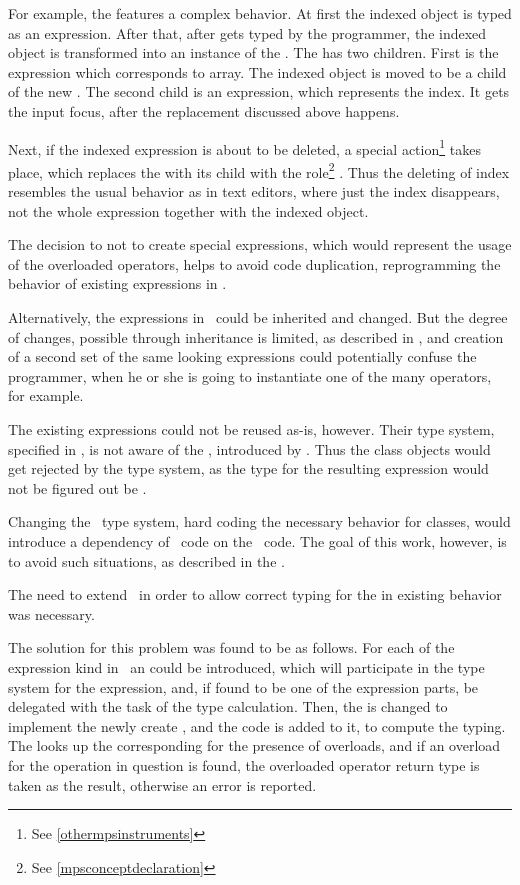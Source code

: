For example,  the  features a complex behavior. At first the indexed 
object is typed as an expression. After that, after \cc{[} gets typed by the programmer,
the indexed object is transformed into an instance of the 
. The  has two children. First is the expression
which corresponds to array. The indexed object is moved to be a child of the new .
The second child is an expression, which represents the index. It gets the input focus,
after the replacement discussed above happens.

Next, if the indexed expression is about to be deleted, a special action\footnote{See \ref{othermpsinstruments}}
takes place, which replaces the  with its child with the role\footnote{See \ref{mpsconceptdeclaration}}
. Thus the deleting of index resembles the usual behavior as in text editors, where
just the index disappears, not the whole expression together with the indexed object.

The decision to not to create special expressions, which would represent the usage of
the overloaded operators, helps to avoid code duplication, reprogramming the behavior of
existing expressions in \mbdr. 

Alternatively, the expressions in \mbdr\ could be inherited and changed. But the 
degree of changes, possible through inheritance is limited, as described in ,
and creation of a second set of the same looking expressions could potentially confuse the
programmer, when he or she is going to instantiate one of the many \cc{+} operators, for example.

The existing expressions could not be reused as-is, however. Their type system, specified
in \mbdr, is not aware of the , introduced by \pcpp. Thus the class
objects would get rejected by the type system, as the type for the resulting expression
would not be figured out be \mbdr.

Changing the \mbdr\ type system, hard coding the necessary behavior for classes, would 
introduce a dependency of \mbdr\ code on the \pcpp\ code. The goal of this work, however,
is to avoid such situations, as described in the .

The need to extend \mbdr\ in order to allow correct typing for the  in
existing behavior was necessary.

The solution for this problem was found to be as follows. For each of the expression kind 
in \mbdr\ an  could be introduced, which will participate in the 
type system for the expression, and, if found to be one of the expression parts, 
be delegated with the task of the type calculation. Then, the  is changed
to implement the newly create , and the code is added to it, to 
compute the typing. The  looks up the corresponding  for 
the presence of overloads, and if an overload for the operation in question is found, 
the overloaded operator return type is taken as the result, otherwise an error is reported.

